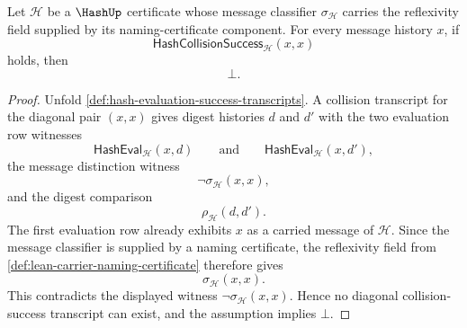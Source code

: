 \begin{theorem}
\label{thm:hash-collision-success-irreflexive-on-message}
Let $\mathcal H$ be a $\HashUp$ certificate whose message classifier $\sigma_{\mathcal H}$ carries the reflexivity field supplied by its naming-certificate component. For every message history $x$, if
$$
\mathsf{HashCollisionSuccess}_{\mathcal H}(x,x)
$$
holds, then
$$
\bot.
$$
\end{theorem}
\begin{proof}
Unfold \autoref{def:hash-evaluation-success-transcripts}. A collision transcript for the diagonal pair $(x,x)$ gives digest histories $d$ and $d'$ with the two evaluation row witnesses
$$
\mathsf{HashEval}_{\mathcal H}(x,d)
\qquad\text{and}\qquad
\mathsf{HashEval}_{\mathcal H}(x,d'),
$$
the message distinction witness
$$
\neg\sigma_{\mathcal H}(x,x),
$$
and the digest comparison
$$
\rho_{\mathcal H}(d,d').
$$
The first evaluation row already exhibits $x$ as a carried message of $\mathcal H$. Since the message classifier is supplied by a naming certificate, the reflexivity field from \autoref{def:lean-carrier-naming-certificate} therefore gives
$$
\sigma_{\mathcal H}(x,x).
$$
This contradicts the displayed witness $\neg\sigma_{\mathcal H}(x,x)$. Hence no diagonal collision-success transcript can exist, and the assumption implies $\bot$.
\end{proof}


